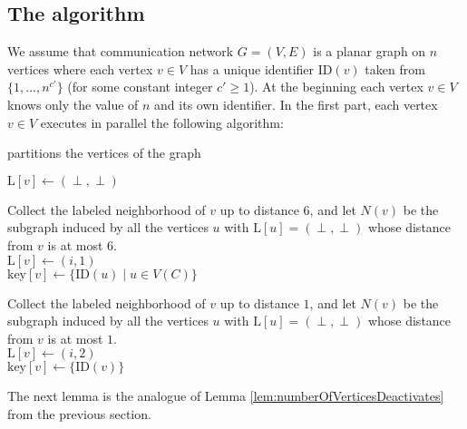 \documentclass{article}
\theoremstyle{definition}
\begin{document}
\subsection{The algorithm}

We assume that communication network $G = (V,E)$ is a planar graph on $n$ vertices where each vertex $v \in V$ has a unique identifier $\text{ID}(v)$ taken from $\{1,...,n^{c'}\}$ (for some constant integer $c' \ge 1$). At the beginning each vertex $v \in V$ knows only the value of $n$ and its own identifier. In the first part, each vertex $v \in V$ executes in parallel the following algorithm:\medskip \smallskip

\begin{algorithm}[H]\label{Alg6ColorPartition}\small
	\caption{partitions the vertices of the graph}
\SetInd{1em}{0em}
$\text{L}[v] \gets (\perp, \perp)$\\

	 { \label{alg:outer6}
	            Collect the labeled neighborhood of $v$ up to distance $6$, and let $N(v)$ be the subgraph induced by all the vertices $u$ with $\text{L}[u] = (\perp, \perp)$ whose distance from $v$ is at most $6$. \\
               {$\text{L}[v] \gets (i,1)$ \\
                    $\text{key}[v] \gets \{\text{ID}(u) \mid u \in V(C)\}$} \smallskip
		


            Collect the labeled neighborhood of $v$ up to distance $1$, and let $N(v)$ be the subgraph induced by all the vertices $u$ with $\text{L}[u] = (\perp, \perp)$ whose distance from $v$ is at most $1$. \\
                {\label{removeLowDeg6} $\text{L}[v] \gets (i,2)$ \\$\text{key}[v] \gets \{\text{ID}(v)\}$}
    }

\end{algorithm}\medskip \smallskip

The next lemma is the analogue of Lemma \ref{lem:numberOfVerticesDeactivates} from the previous section.
\end{document}
